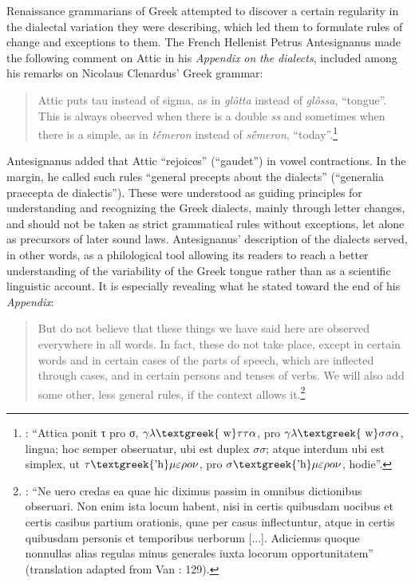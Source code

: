 \documentclass[output=paper]{langsci/langscibook}
\begin{document}
Renaissance grammarians of Greek attempted to discover a certain regularity in the dialectal variation they were describing, which led them to formulate rules of change and exceptions to them. The French Hellenist Petrus Antesignanus made the following comment on Attic in his \textit{Appendix} \textit{on} \textit{the} \textit{dialects}, included among his remarks on Nicolaus Clenardus’ Greek grammar:

\begin{quote}
Attic puts tau instead of sigma, as in \textit{glôtta} instead of \textit{glôssa}, “tongue”. This is always observed when there is a double \textit{ss} and sometimes when there is a simple, as in \textit{tḗmeron} instead of \textit{sḗmeron}, “today”.\footnote{ \textrm{\citet[13]{Antesignanus1554}: “Attica ponit τ pro σ, $\gamma \lambda \text{\textgreek{~w}}\tau \tau \alpha $, pro $\gamma \lambda \text{\textgreek{~w}}\sigma \sigma \alpha $, lingua; hoc semper obseruatur, ubi est duplex $\sigma \sigma $; atque interdum ubi est simplex, ut $\tau \text{\textgreek{'h}}\mu \varepsilon \rho o\nu $, pro $\sigma \text{\textgreek{'h}}\mu \varepsilon \rho o\nu $, hodie”.}}
\end{quote}

Antesignanus added that Attic “rejoices” (“gaudet”) in vowel contractions. In the margin, he called such rules “general precepts about the dialects” (“generalia praecepta de dialectis”). These were understood as guiding principles for understanding and recognizing the Greek dialects, mainly through letter changes, and should not be taken as strict grammatical rules without exceptions, let alone as precursors of later sound laws. Antesignanus’ description of the dialects served, in other words, as a philological tool allowing its readers to reach a better understanding of the variability of the Greek tongue rather than as a scientific linguistic account. It is especially revealing what he stated toward the end of his \textit{Appendix}:

\begin{quote}
But do not believe that these things we have said here are observed everywhere in all words. In fact, these do not take place, except in certain words and in certain cases of the parts of speech, which are inflected through cases, and in certain persons and tenses of verbs. We will also add some other, less general rules, if the context allows it.\footnote{ \textrm{\citet[15]{Antesignanus1554}: “Ne uero credas ea quae hic diximus passim in omnibus dictionibus obseruari. Non enim ista locum habent, nisi in certis quibusdam uocibus et certis casibus partium orationis, quae per casus inflectuntur, atque in certis quibusdam personis et temporibus uerborum [...]. Adiciemus quoque nonnullas alias regulas minus generales iuxta locorum opportunitatem” (translation adapted from Van \citealt{Rooy2016c}: 129).}}
\end{quote}
\end{document}
